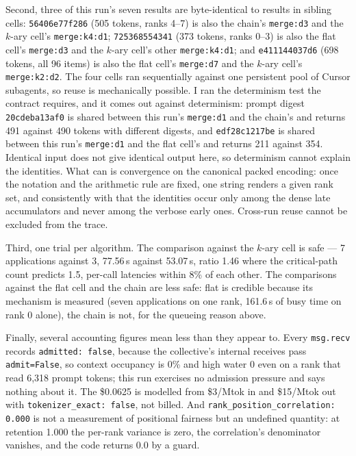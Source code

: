 \documentclass[11pt]{article}
\begin{document}
Second, three of this run's seven results are byte-identical to results in sibling cells:
\texttt{56406e77f286} (505 tokens, ranks 4--7) is also the chain's \texttt{merge:d3} and the
$k$-ary cell's \texttt{merge:k4:d1}; \texttt{725368554341} (373 tokens, ranks 0--3) is also
the flat cell's \texttt{merge:d3} and the $k$-ary cell's other \texttt{merge:k4:d1}; and
\texttt{e411144037d6} (698 tokens, all 96 items) is also the flat cell's \texttt{merge:d7}
and the $k$-ary cell's \texttt{merge:k2:d2}. The four cells ran sequentially against one
persistent pool of Cursor subagents, so reuse is mechanically possible. I ran the
determinism test the contract requires, and it comes out against determinism: prompt digest
\texttt{20cdeba13af0} is shared between this run's \texttt{merge:d1} and the chain's and
returns 491 against 490 tokens with different digests, and \texttt{edf28c1217be} is shared
between this run's \texttt{merge:d1} and the flat cell's and returns 211 against 354.
Identical input does not give identical output here, so determinism cannot explain the
identities. What can is convergence on the canonical packed encoding: once the notation and
the arithmetic rule are fixed, one string renders a given rank set, and consistently with
that the identities occur only among the dense late accumulators and never among the verbose
early ones. Cross-run reuse cannot be excluded from the trace.

Third, one trial per algorithm. The comparison against the $k$-ary cell is safe --- 7
applications against 3, 77.56\,s against 53.07\,s, ratio 1.46 where the critical-path count
predicts 1.5, per-call latencies within 8\% of each other. The comparisons against the flat
cell and the chain are less safe: flat is credible because its mechanism is measured (seven
applications on one rank, 161.6\,s of busy time on rank 0 alone), the chain is not, for the
queueing reason above.

Finally, several accounting figures mean less than they appear to. Every \texttt{msg.recv}
records \texttt{admitted: false}, because the collective's internal receives pass
\texttt{admit=False}, so context occupancy is 0\% and high water 0 even on a rank that read
6{,}318 prompt tokens; this run exercises no admission pressure and says nothing about it.
The \$0.0625 is modelled from \$3/Mtok in and \$15/Mtok out with \texttt{tokenizer\_exact:
false}, not billed. And \texttt{rank\_position\_correlation: 0.000} is not a measurement of
positional fairness but an undefined quantity: at retention 1.000 the per-rank variance is
zero, the correlation's denominator vanishes, and the code returns 0.0 by a guard.
\end{document}
